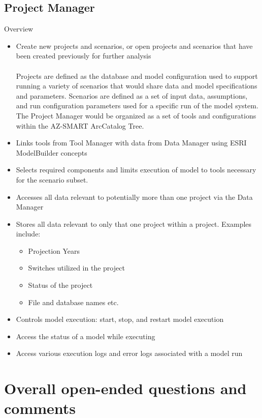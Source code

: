\documentclass[titlepage]{article}
\begin{document}
\subsection{Project Manager}

Overview

\begin{itemize}
	\item Create new projects and scenarios, or open projects and scenarios that have been created previously for further analysis
	\\\\ Projects are defined as the database and model configuration used to support running a variety of scenarios that would share data and model specifications and parameters.  Scenarios are defined as a set of input data, assumptions, and run configuration parameters used for a specific run of the model system.  The Project Manager would be organized as a set of tools and configurations within the AZ-SMART ArcCatalog Tree.
	\item Links tools from Tool Manager with data from Data Manager using ESRI ModelBuilder concepts
	\item Selects required components and limits execution of model to tools necessary for the scenario subset.
 	\item Accesses all data relevant to potentially more than one project via the Data Manager
	\item Stores all data relevant to only that one project within a project. Examples include:
		\begin{itemize}
			\item Projection Years
			\item Switches utilized in the project
			\item Status of the project
			\item File and database names etc.
		\end{itemize}
	\item Controls model execution: start, stop, and restart model execution
	\item Access the status of a model while executing
	\item Access various execution logs and error logs associated with a model run
\end{itemize}

\section{Overall open-ended questions and comments}
\end{document}
